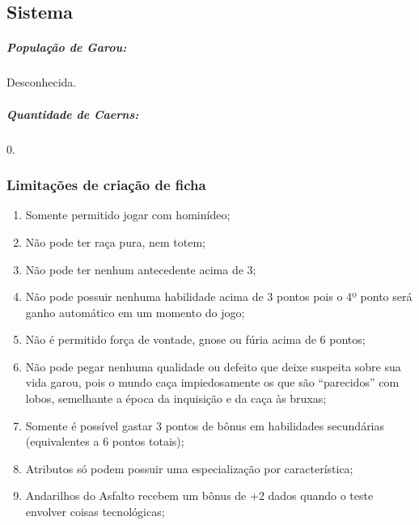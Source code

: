 \subsection{\bf Sistema}
\subparagraph{\bf População de Garou:} Desconhecida.
\subparagraph{\bf Quantidade de Caerns:} 0.

\subsubsection{\bf Limitações de criação de ficha}
\begin{enumerate}
\item Somente permitido jogar com hominídeo;
\item Não pode ter raça pura, nem totem;
\item Não pode ter nenhum antecedente acima de 3;
\item Não pode possuir nenhuma habilidade acima de 3 pontos pois o 4º ponto será ganho automático em um momento do jogo;
\item Não é permitido força de vontade, gnose ou fúria acima de 6 pontos;
\item Não pode pegar nenhuma qualidade ou defeito que deixe suspeita sobre sua vida garou, pois o mundo caça impiedosamente os que são “parecidos” com lobos, semelhante a época da inquisição e da caça às bruxas;
\item Somente é possível gastar 3 pontos de bônus em habilidades secundárias (equivalentes a 6 pontos totais);
\item Atributos só podem possuir uma especialização por característica;
\item Andarilhos do Asfalto recebem um bônus de +2 dados quando o teste envolver coisas tecnológicas;
\end{enumerate}

